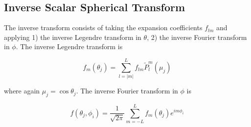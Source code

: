 


%

{\footnotesize
{}
}



\subsection{Inverse Scalar Spherical Transform}

The inverse transform consists of taking the expansion coefficients $f_{lm}$ and applying 1) the inverse Legendre transform in $\theta$, 2) the inverse Fourier transform in $\phi$.  The inverse Legendre transform is 

\begin{equation}
f_m(\theta_j) = \sum_{l = \vert m \vert}^{L} f_{lm} \widetilde{P}_l^m(\mu_j)
\label{eqist1}
\end{equation}

\noindent where again $\mu_j = \cos\theta_j$.  The inverse Fourier transform in $\phi$ is

\begin{equation}
f(\theta_j,\phi_i) = \dfrac{1}{\sqrt{2\pi}}\sum_{m = -L}^{L} f_m(\theta_j) e^{im\phi_i}
\label{eqist2}
\end{equation}

